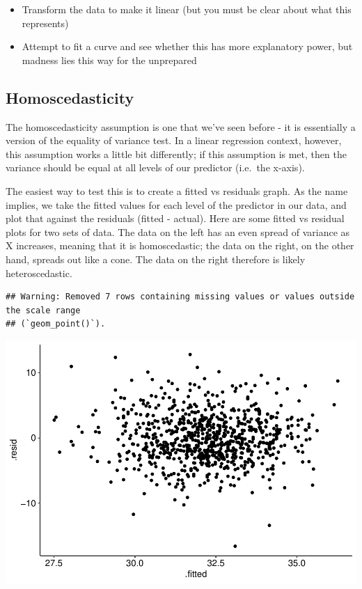 \documentclass[
]{book}
\providecommand{\tightlist}{%
  \setlength{\itemsep}{0pt}\setlength{\parskip}{0pt}}
\begin{document}
\begin{itemize}
\tightlist
\item
  Transform the data to make it linear (but you must be clear about what this represents)
\item
  Attempt to fit a curve and see whether this has more explanatory power, but madness lies this way for the unprepared
\end{itemize}

\subsection{Homoscedasticity}\label{homoscedasticity}

The homoscedasticity assumption is one that we've seen before - it is essentially a version of the equality of variance test. In a linear regression context, however, this assumption works a little bit differently; if this assumption is met, then the variance should be equal at all levels of our predictor (i.e.~the x-axis).

The easiest way to test this is to create a fitted vs residuals graph. As the name implies, we take the fitted values for each level of the predictor in our data, and plot that against the residuals (fitted - actual). Here are some fitted vs residual plots for two sets of data. The data on the left has an even spread of variance as X increases, meaning that it is homoscedastic; the data on the right, on the other hand, spreads out like a cone. The data on the right therefore is likely heteroscedastic.

\begin{verbatim}
## Warning: Removed 7 rows containing missing values or values outside the scale range
## (`geom_point()`).
\end{verbatim}

\begin{center}\includegraphics{_main_files/figure-latex/unnamed-chunk-206-1} \end{center}
\end{document}
